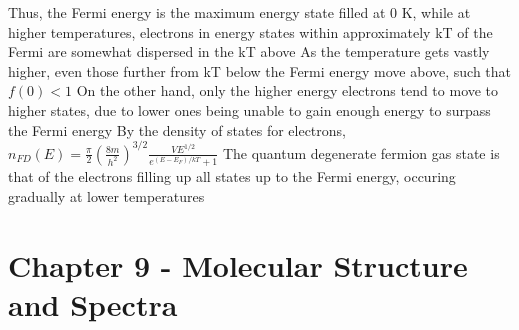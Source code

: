 \documentclass[11 pt, twoside]{article}
\newenvironment{outline*}
{
	\begin{outline}[enumerate]
	}
	{\end{outline}
}
\begin{document}
\begin{outline*}
		\3 Thus, the Fermi energy is the maximum energy state filled at 0 K, while at higher temperatures, electrons in energy states within approximately kT of the Fermi are somewhat dispersed in the kT above
			\4 As the temperature gets vastly higher, even those further from kT below the Fermi energy move above, such that $f(0) < 1$
			\4 On the other hand, only the higher energy electrons tend to move to higher states, due to lower ones being unable to gain enough energy to surpass the Fermi energy
		\3 By the density of states for electrons, $n_{FD}(E) = \frac{\pi}{2}(\frac{8m}{h^2})^{3/2}\frac{VE^{1/2}}{e^{(E - E_F)/kT} + 1}$
	\2 The quantum degenerate fermion gas state is that of the electrons filling up all states up to the Fermi energy, occuring gradually at lower temperatures
\end{outline*}
\section{Chapter 9 - Molecular Structure and Spectra}
\end{document}
